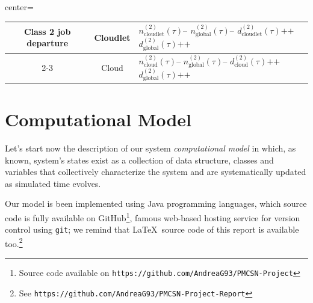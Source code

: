 \documentclass[10pt,a4paper]{article}
\begin{document}
\begin{table}[h!]
\begin{adjustbox}{center=\textwidth}
\begin{tabular}{c|c|p{2.5cm}}
      \multirow{8}{*}{Class 2 job departure} & \multirow{4}{*}{Cloudlet} & $n_{\text{cloudlet}}^{(2)}(\tau)\texttt{--}$ \newline $n_{\text{global}}^{(2)}(\tau)\texttt{--}$ \newline $d_{\text{cloudlet}}^{(2)}(\tau)\texttt{++}$ \newline $d_{\text{global}}^{(2)}(\tau)\texttt{++}$ \\ \cline{2-3} 
      & \multirow{4}{*}{Cloud} & $n_{\text{cloud}}^{(2)}(\tau)\texttt{--}$ \newline $n_{\text{global}}^{(2)}(\tau)\texttt{--}$ \newline $d_{\text{cloud}}^{(2)}(\tau)\texttt{++}$ \newline $d_{\text{global}}^{(2)}(\tau)\texttt{++}$ \\
 
      \bottomrule


    \end{tabular}
    \end{adjustbox}
\end{table}




\clearpage
\newpage
\section{Computational Model}

Let's start now the description of our system \textit{computational model} in which, as known, system's states exist as a collection of data structure, classes and variables that collectively characterize the system and are systematically updated as simulated time evolves.

Our model is been implemented using Java programming languages, which source code is fully available on GitHub\footnote{Source code available on \texttt{https://github.com/AndreaG93/PMCSN-Project}}, famous web-based hosting service for version control using \texttt{git}; we remind that \LaTeX\ source code of this report is available too.\footnote{See \texttt{https://github.com/AndreaG93/PMCSN-Project-Report}}
\end{document}
